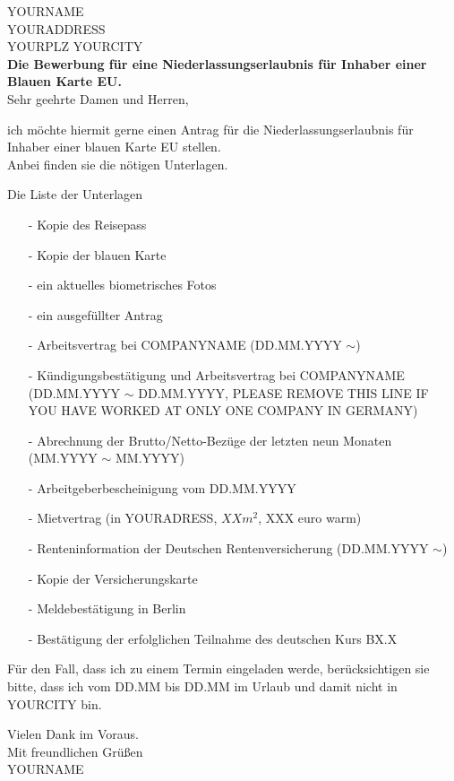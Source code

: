 \documentclass[10pt]{article}
\begin{document}
\vspace{-12cm}
YOURNAME \\
YOURADDRESS \\
YOURPLZ YOURCITY\\[1em]
{\bf Die Bewerbung für eine Niederlassungserlaubnis f\"ur Inhaber einer Blauen Karte EU.}\\[1em]

Sehr geehrte Damen und Herren,

ich m\"ochte hiermit gerne einen Antrag f\"ur die Niederlassungserlaubnis
f\"ur Inhaber einer blauen Karte EU stellen.\\
Anbei finden sie die n\"otigen Unterlagen.

Die Liste der Unterlagen
\begin{itemize}
\item[-] Kopie des Reisepass
\item[-] Kopie der blauen Karte
\item[-] ein aktuelles biometrisches Fotos
\item[-] ein ausgef\"ullter Antrag
\item[-] Arbeitsvertrag bei COMPANYNAME (DD.MM.YYYY $\sim$)
\item[-] K\"undigungsbest\"atigung und Arbeitsvertrag bei COMPANYNAME (DD.MM.YYYY $\sim$ DD.MM.YYYY,
    PLEASE REMOVE THIS LINE IF YOU HAVE WORKED AT ONLY ONE COMPANY IN GERMANY)
\item[-] Abrechnung der Brutto/Netto-Bez\"uge der letzten neun Monaten (MM.YYYY $\sim$ MM.YYYY)
\item[-] Arbeitgeberbescheinigung vom DD.MM.YYYY
\item[-] Mietvertrag (in YOURADRESS, $XXm^2$, XXX euro warm)
\item[-] Renteninformation der Deutschen Rentenversicherung (DD.MM.YYYY $\sim$)
\item[-] Kopie der Versicherungskarte
\item[-] Meldebest\"atigung in Berlin
\item[-] Best\"atigung der erfolglichen Teilnahme des deutschen Kurs BX.X
\end{itemize}

Für den Fall, dass ich zu einem Termin eingeladen werde, berücksichtigen sie bitte, dass ich vom
DD.MM bis DD.MM im Urlaub und damit nicht in YOURCITY bin.

Vielen Dank im Voraus.
\\[1em]

Mit freundlichen Gr\"u{\ss}en\\
YOURNAME
\end{document}
